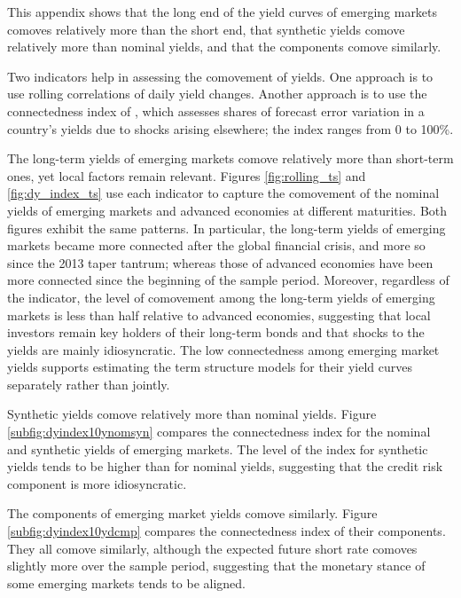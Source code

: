 \documentclass[a4paper, 12pt]{article}
\begin{document}
\begin{appendices}
	This appendix shows that the long end of the yield curves of emerging markets comoves relatively more than the short end, that synthetic yields comove relatively more than nominal yields, and that the components comove similarly. 
	
	Two indicators help in assessing the comovement of yields. One approach is to use rolling correlations of daily yield changes. Another approach is to use the connectedness index of \cite{DieboldYilmaz:2014}, which assesses shares of forecast error variation in a country's yields due to shocks arising elsewhere; the index ranges from 0 to 100\%. 
	
	The long-term yields of emerging markets comove relatively more than short-term ones, yet local factors remain relevant. Figures \ref{fig:rolling_ts} and \ref{fig:dy_index_ts} use each indicator to capture the comovement of the nominal yields of emerging markets and advanced economies at different maturities. Both figures exhibit the same patterns. In particular, the long-term yields of emerging markets became more connected after the global financial crisis, and more so since the 2013 taper tantrum; whereas those of advanced economies have been more connected since the beginning of the sample period. Moreover, regardless of the indicator, the level of comovement among the long-term yields of emerging markets is less than half relative to advanced economies, suggesting that local investors remain key holders of their long-term bonds and that shocks to the yields are mainly idiosyncratic. The low connectedness among emerging market yields supports estimating the term structure models for their yield curves separately rather than jointly. 
	
	Synthetic yields comove relatively more than nominal yields. Figure \ref{subfig:dyindex10ynomsyn} compares the connectedness index for the nominal and synthetic yields of emerging markets. The level of the index for synthetic yields tends to be higher than for nominal yields, suggesting that the credit risk component is more idiosyncratic. 
	
	The components of emerging market yields comove similarly. Figure \ref{subfig:dyindex10ydcmp} compares the connectedness index of their components. They all comove similarly, although the expected future short rate comoves slightly more over the sample period, suggesting that the monetary stance of some emerging markets tends to be aligned. 
	

\end{appendices}
\end{document}
